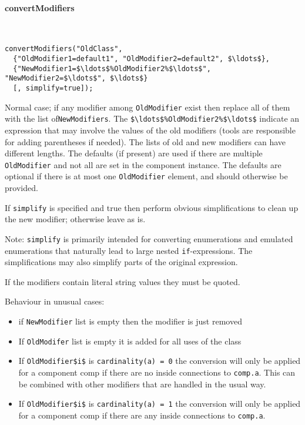 \paragraph*{convertModifiers}\label{convertmodifiers}
\ %

\begin{lstlisting}[language=modelica]
convertModifiers("OldClass",
  {"OldModifier1=default1", "OldModifier2=default2", $\ldots$},
  {"NewModifier1=$\ldots$%OldModifier2%$\ldots$", "NewModifier2=$\ldots$", $\ldots$}
  [, simplify=true]);
\end{lstlisting}

Normal case; if any modifier among \lstinline!OldModifier! exist then replace all of them with the list of\linebreak[4] \lstinline!NewModifiers!.
The \lstinline!$\ldots$%OldModifier2%$\ldots$! indicate an expression that may involve the values of the old modifiers (tools are responsible for adding parentheses if needed).
The lists of old and new modifiers can have different lengths.
The defaults (if present) are used if there are multiple \lstinline!OldModifier! and not all are set in the component instance.
The defaults are optional if there is at most one \lstinline!OldModifier! element, and should otherwise be provided.

If \lstinline!simplify! is specified and true then perform obvious simplifications
to clean up the new modifier; otherwise leave as is.

\begin{nonnormative}
Note: \lstinline!simplify! is primarily intended for converting enumerations and emulated enumerations that naturally lead to large nested \lstinline!if!-expressions.
The simplifications may also simplify parts of the original expression.
\end{nonnormative}

If the modifiers contain literal string values they must be quoted.

Behaviour in unusual cases:
\begin{itemize}
\item
  if \lstinline!NewModifier! list is empty then the modifier is just removed
\item
  If \lstinline!OldModifer! list is empty it is added for all uses of the class
\item
  If \lstinline!OldModifier$i$! is \lstinline!cardinality(a) = 0! the conversion will only be applied for a component comp if there are no inside connections to \lstinline!comp.a!. This can be combined with other modifiers that are handled in the usual way.
\item
  If \lstinline!OldModifier$i$! is \lstinline!cardinality(a) = 1! the conversion will only be applied for a component comp if there are any inside connections to \lstinline!comp.a!.
\end{itemize}

